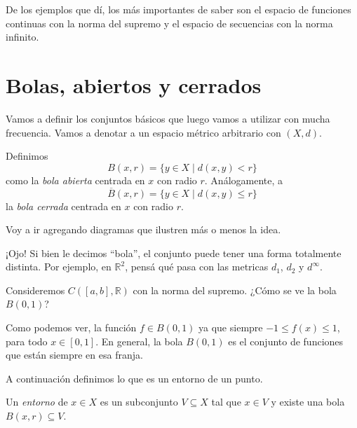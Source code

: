 De los ejemplos que dí, los más importantes de saber son el espacio de funciones continuas con la norma del supremo y el espacio de secuencias con la norma infinito.


\section{Bolas, abiertos y cerrados}

Vamos a definir los conjuntos básicos que luego vamos a utilizar con mucha frecuencia. Vamos a denotar a un espacio métrico arbitrario con $(X, d)$.

\begin{definition}
	Definimos
	$$
		B(x, r) = \{ y \in X \mid d(x, y) < r\}
	$$
	como la \emph{bola abierta} centrada en $x$ con radio $r$. Análogamente, a
	$$
		\overline{B}(x, r) = \{ y \in X \mid d(x, y) \leq  r\}
	$$
	la \emph{bola cerrada} centrada en $x$ con radio $r$.
\end{definition}

Voy a ir agregando diagramas que ilustren más o menos la idea.

\begin{center}
	
\end{center}

¡Ojo! Si bien le decimos ``bola'', el conjunto puede tener una forma totalmente distinta. Por ejemplo, en $\mathbb{R}^2$, pensá qué pasa con las metricas $d_1$, $d_2$ y $d^{\infty}$.

\begin{example}
	Consideremos $C([a, b], \mathbb{R})$ con la norma del supremo. ¿Cómo se ve la bola $B(0, 1)$?

	\begin{center}
		
	\end{center}

	Como podemos ver, la función $f \in B(0, 1)$ ya que siempre $-1 \leq f(x) \leq 1$, para todo $x \in [0, 1]$. En general, la bola $B(0, 1)$ es el conjunto de funciones que están siempre en esa franja.
\end{example}

A continuación definimos lo que es un entorno de un punto.

\begin{definition}
	Un \emph{entorno} de $x \in X$ es un subconjunto $V \subseteq X$ tal que $x \in V$ y existe una bola $B(x, r) \subseteq V$.
\end{definition}

